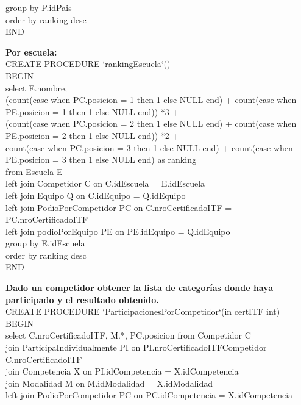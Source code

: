 \begin{itemize}
{		group by P.idPais\\
		order by ranking desc\;\\
END\\
\item \textbf{Por escuela:}\\
CREATE PROCEDURE `rankingEscuela`()\\
BEGIN\\
select E.nombre,\\
	(count(case when PC.posicion = 1 then 1 else NULL end) + count(case when PE.posicion = 1 then 1 else NULL end)) *3 + \\
	(count(case when PC.posicion = 2 then 1 else NULL end) + count(case when PE.posicion = 2 then 1 else NULL end)) *2 +\\
    count(case when PC.posicion = 3 then 1 else NULL end) + count(case when PE.posicion = 3 then 1 else NULL end) as ranking\\
    from Escuela E\\
		left join Competidor C on C.idEscuela = E.idEscuela\\
		left join Equipo Q on C.idEquipo = Q.idEquipo\\
		left join PodioPorCompetidor PC on C.nroCertificadoITF = PC.nroCertificadoITF\\
		left join podioPorEquipo PE on PE.idEquipo = Q.idEquipo\\
		
		group by E.idEscuela\\
		order by ranking desc\;\\
END\\
}

\newpage

\item{\textbf{Dado un competidor obtener la lista de categorías donde haya participado y el resultado obtenido.}\\
CREATE PROCEDURE `ParticipacionesPorCompetidor`(in certITF int)\\
BEGIN\\
select C.nroCertificadoITF, M.*, PC.posicion from Competidor C\\
	join ParticipaIndividualmente PI on PI.nroCertificadoITFCompetidor = C.nroCertificadoITF\\
    join Competencia X on PI.idCompetencia = X.idCompetencia\\
    join Modalidad M on M.idModalidad = X.idModalidad\\
    left join PodioPorCompetidor PC on PC.idCompetencia = X.idCompetencia\\
    
}
\end{itemize}
